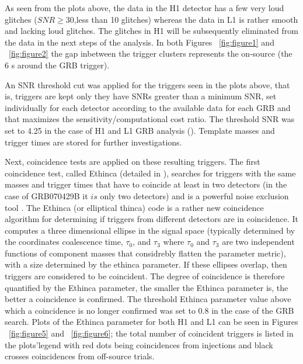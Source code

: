 \documentclass[epsf]{article}
\begin{document}
As seen from the plots above, the data in the H1 detector has a few very loud glitches ($SNR\geq30$,less than 10 glitches) whereas the data in L1 is rather smooth and lacking loud glitches. The glitches in H1 will be subsequently eliminated from the data in the next steps of the analysis. In both Figures ~\ref{fig:figure1} and ~\ref{fig:figure2} the gap inbetween the trigger clusters represents the on-source (the 6 s around the GRB trigger).   

 An SNR threshold cut was applied for the triggers seen in the plots above, that is, triggers are kept only they have SNRs greater than a minimum SNR, set individually for each detector according to the available data for each GRB and that maximizes the sensitivity/computational cost ratio. The threshold SNR was set to 4.25 in the case of H1 and L1 GRB analysis (\cite{grb}). Template masses and trigger times are stored for further investigations. 

Next, coincidence tests are applied on these resulting triggers. The first coincidence test, called Ethinca (detailed in \cite{craig}), searches for triggers with the same masses and trigger times that have to coincide at least in two detectors (in the case of GRB070429B it $is$ only two detectors) and is a powerful noise exclusion tool . The Ethinca (or elliptical thinca) code is a rather new coincidence algorithm for determining if triggers from different detectors are in coincidence. It computes a three dimensional ellipse in the signal space (typically determined by the coordinates coalescence time, $\tau_0$, and $\tau_3$ where $\tau_0$ and $\tau_3$ are two independent functions of component masses that considrebly flatten the parameter metric), with a size determined by the ethinca parameter. If these ellipses overlap, then triggers are considered to be coincident. The degree of coincidence is therefore quantified by the Ethinca parameter, the smaller the Ethinca parameter is, the better a coincidence is confirmed. The threshold Ethinca parameter value above which a coincidence is no longer confirmed was set to 0.8 in the case of the GRB search. Plots of the Ethinca parameter for both H1 and L1 can be seen in Figures ~\ref{fig:figure5} and ~\ref{fig:figure6}; the total number of coincident triggers is listed in the plots'legend with red dots being coincidences from injections and black crosses coincidences from off-source trials.
\end{document}
